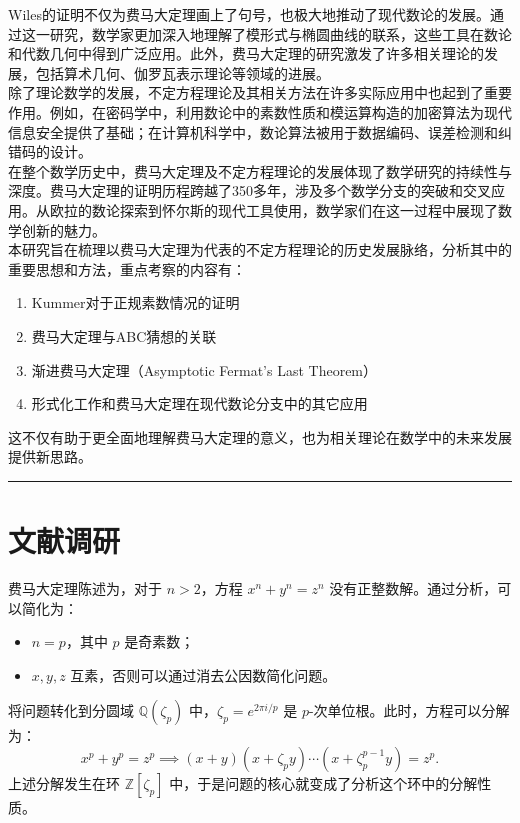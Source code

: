 \documentclass{article}
\begin{document}
\noindent
Wiles的证明不仅为费马大定理画上了句号，也极大地推动了现代数论的发展。通过这一研究，数学家更加深入地理解了模形式与椭圆曲线的联系，这些工具在数论和代数几何中得到广泛应用。此外，费马大定理的研究激发了许多相关理论的发展，包括算术几何、伽罗瓦表示理论等领域的进展。\\

\noindent
除了理论数学的发展，不定方程理论及其相关方法在许多实际应用中也起到了重要作用。例如，在密码学中，利用数论中的素数性质和模运算构造的加密算法为现代信息安全提供了基础；在计算机科学中，数论算法被用于数据编码、误差检测和纠错码的设计。\\

\noindent
在整个数学历史中，费马大定理及不定方程理论的发展体现了数学研究的持续性与深度。费马大定理的证明历程跨越了350多年，涉及多个数学分支的突破和交叉应用。从欧拉的数论探索到怀尔斯的现代工具使用，数学家们在这一过程中展现了数学创新的魅力。\\

\noindent
本研究旨在梳理以费马大定理为代表的不定方程理论的历史发展脉络，分析其中的重要思想和方法，重点考察的内容有：
\begin{enumerate}
\item Kummer对于正规素数情况的证明
\item 费马大定理与ABC猜想的关联
\item 渐进费马大定理（Asymptotic Fermat's Last Theorem）
\item 形式化工作和费马大定理在现代数论分支中的其它应用
\end{enumerate}
这不仅有助于更全面地理解费马大定理的意义，也为相关理论在数学中的未来发展提供新思路。

\newpage
\hrule
\part{文献调研}

\noindent
费马大定理陈述为，对于 $n > 2$，方程 $x^n + y^n = z^n$ 没有正整数解。通过分析，可以简化为：
\begin{itemize}
    \item $n=p$，其中 $p$ 是奇素数；
    \item $x,y,z$ 互素，否则可以通过消去公因数简化问题。
\end{itemize}

\noindent
\newline
将问题转化到分圆域 $\mathbb{Q}(\zeta_p)$ 中，$\zeta_p = e^{2\pi i / p}$ 是 $p$-次单位根。此时，方程可以分解为：
$$
x^p + y^p = z^p \implies (x+y)(x+\zeta_p y)\cdots(x+\zeta_p^{p-1}y) = z^p.
$$
上述分解发生在环 $\mathbb{Z}[\zeta_p]$ 中，于是问题的核心就变成了分析这个环中的分解性质。
\end{document}
